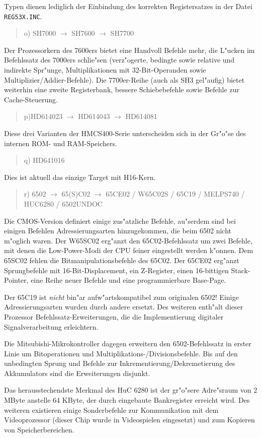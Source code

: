 \documentclass[12pt,a4paper,twoside]{report}
\newcommand{\tty}[1]{{\tt #1}}
\begin{document}
Typen dienen lediglich der Einbindung des korrekten Registersatzes
in der Datei \tty{REG53X.INC}.
\begin{quote}
o) SH7000 $\longrightarrow$ SH7600 $\longrightarrow$ SH7700
\end{quote}
Der Prozessorkern des 7600ers bietet eine Handvoll Befehle mehr, die
L"ucken im Befehlssatz des 7000ers schlie"sen (verz"ogerte, bedingte
sowie relative und indirekte Spr"unge, Multiplikationen mit 32-Bit-Operanden
sowie Multiplizier/Addier-Befehle).  Die 7700er-Reihe (auch als SH3
gel"aufig) bietet weiterhin eine zweite Registerbank, bessere
Schiebebefehle sowie Befehle zur Cache-Steuerung.
\begin{quote}
p)HD614023 $\longrightarrow$ HD614043 $\longrightarrow$ HD614081
\end{quote}
Diese drei Varianten der HMCS400-Serie unterscheiden sich in der
Gr"o"se des internen ROM- und RAM-Speichers.
\begin{quote}
q) HD641016
\end{quote}
Dies ist aktuell das einzige Target mit H16-Kern.
\begin{quote}
r) 6502 $\rightarrow$ 65(S)C02 $\rightarrow$ 65CE02 / W65C02S /
   65C19 / MELPS740 / HUC6280 / 6502UNDOC
\end{quote}
Die CMOS-Version definiert einige zus"atzliche Befehle, au"serdem sind
bei einigen Befehlen Adressierungsarten hinzugekommen, die beim 6502
nicht m"oglich waren.  Der W65SC02 erg"anzt den
65C02-Befehlssatz um zwei Befehle, mit denen die Low-Power-Modi
der CPU feiner eingestellt werden k"onnen.  Dem 65SC02 fehlen die
Bitmanipulationsbefehle des 65C02.  Der 65CE02 erg"anzt Sprungbefehle
mit 16-Bit-Displacement, ein Z-Register, einen 16-bittigen Stack-Pointer,
eine Reihe neuer Befehle und eine programmierbare Base-Page.

Der 65C19 ist {\em nicht} bin"ar aufw"artskompatibel zum
originalen 6502!  Einige Adressierungsarten wurden durch andere
ersetzt.  Des weiteren enth"alt dieser Prozessor
Befehlssatz-Erweiterungen, die die Implementierung digitaler
Signalverarbeitung erleichtern.

Die Mitsubishi-Mikrokontroller dagegen erweitern den
6502-Befehlssatz in erster Linie um Bitoperationen und
Multiplikations-/Divisionsbefehle.  Bis auf den unbedingten Sprung und
Befehle zur Inkrementierung/Dekremetierung des Akkumulators sind die
Erweiterungen disjunkt.

Das herausstechendste Merkmal des HuC 6280 ist der gr"o"sere
Adre"sraum von 2 MByte anstelle 64 KByte, der durch eingebaute
Bankregister erreicht wird.   Des weiteren existieren einige
Sonderbefehle zur Kommunikation mit dem Videoprozessor (dieser
Chip wurde in Videospielen eingesetzt) und zum Kopieren von
Speicherbereichen.
\end{document}
